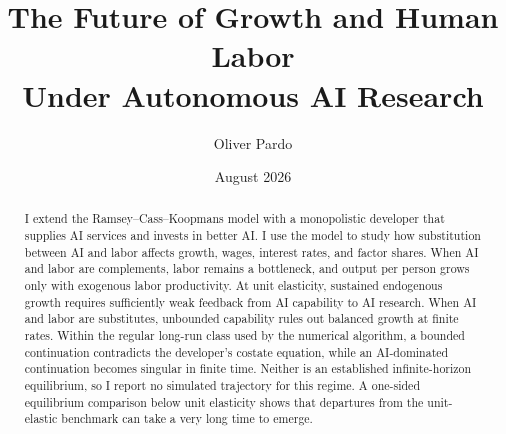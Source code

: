 \documentclass[11pt]{article}
\title{The Future of Growth and Human Labor\\
Under Autonomous AI Research}
\author{Oliver Pardo}
\date{August 2026}
\theoremstyle{definition}
\begin{document}
\maketitle

\begin{abstract}
I extend the Ramsey--Cass--Koopmans model with a monopolistic developer that
supplies AI services and invests in better AI. I use the model to study how
substitution between AI and labor affects growth, wages, interest rates, and
factor shares. When AI and labor are complements, labor remains a bottleneck,
and output per person grows only with exogenous labor productivity. At unit
elasticity, sustained endogenous growth requires sufficiently weak feedback
from AI capability to AI research. When AI and labor are substitutes, unbounded
capability rules out balanced growth at finite rates. Within the regular
long-run class used by the numerical algorithm, a bounded continuation
contradicts the developer's costate equation, while an AI-dominated continuation
becomes singular in finite time. Neither is an established infinite-horizon
equilibrium, so I report no simulated trajectory for this regime. A
one-sided equilibrium comparison below unit elasticity shows that departures
from the unit-elastic benchmark can take a very long time to emerge.
\end{abstract}

\onehalfspacing







\appendix




\end{document}
